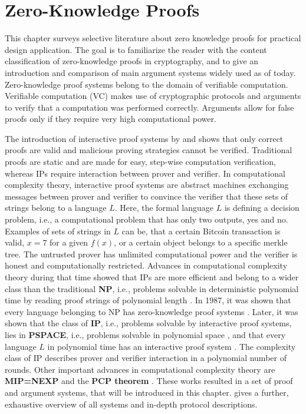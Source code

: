 \chapter{Zero-Knowledge Proofs}
This chapter surveys selective literature about zero knowledge proofs for practical design application. The goal is to familiarize the reader with the content classification of zero-knowledge proofs in cryptography, and to give an introduction and comparison of main argument systems widely used as of today. Zero-knowledge proof systems belong to the domain of verifiable computation. Verifiable computation (VC) makes use of cryptographic protocols and arguments to verify that a computation was performed correctly. Arguments allow for false proofs only if they require very high computational power. 

The introduction of interactive proof systems by \citet{GoldwasserIPs} and \citet{BabaiIPs} shows that only correct proofs are valid and malicious proving strategies cannot be verified. Traditional proofs are static and are made for easy, step-wise computation verification, whereas IPs require interaction between prover and verifier. In computational complexity theory, interactive proof systems are abstract machines exchanging messages between prover and verifier to convince the verifier that these sets of strings belong to a language \(L\). Here, the formal language \(L\) is defining a decision problem, i.e., a computational problem that has only two outputs, yes and no. Examples of sets of strings in \(L\) can be, that a certain Bitcoin transaction is valid, \(x = 7\) for a given \(f(x)\), or a certain object belongs to a specific merkle tree. The untrusted prover has unlimited computational power and the verifier is honest and computationally restricted. Advances in computational complexity theory during that time showed that IPs are more efficient and belong to a wider class than the traditional \textbf{NP}, i.e., problems solvable in deterministic polynomial time by reading proof strings of polynomial length \citep{SassonIOPsinproceedings}. In 1987, it was shown that every language belonging to NP has zero-knowledge proof systems \citep{anymental10.1145/28395.28420}. Later, it was shown that the class of \textbf{IP}, i.e., problems solvable by interactive proof systems, lies in \textbf{PSPACE}, i.e., problems solvable in polynomial space \citep{Shamir10.1145/146585.146609}, and that every language \(L\) in polynomial time has an interactive proof system \citep{Lund10.1145/146585.146605}. The complexity class of IP describes prover and verifier interaction in a polynomial number of rounds. Other important advances in computational complexity theory are \textbf{MIP=NEXP} \citep{Laszlo} and the \textbf{PCP theorem} \citep{PCPTheorem10.1145/278298.278306}. These works resulted in a set of proof and argument systems, that will be introduced in this chapter. \citet{Thaler} gives a further, exhaustive overview of all systems and in-depth protocol descriptions. 

